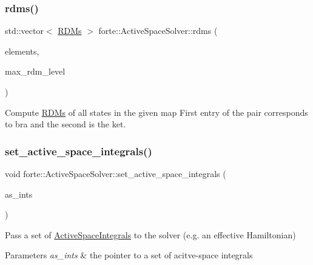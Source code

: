 \subsubsection{\texorpdfstring{rdms()}{rdms()}}
{\footnotesize\ttfamily std\+::vector$<$ \mbox{\hyperlink{classforte_1_1_r_d_ms}{R\+D\+Ms}} $>$ forte\+::\+Active\+Space\+Solver\+::rdms (\begin{DoxyParamCaption}\item[{std\+::map$<$ std\+::pair$<$ \mbox{\hyperlink{classforte_1_1_state_info}{State\+Info}}, \mbox{\hyperlink{classforte_1_1_state_info}{State\+Info}} $>$, std\+::vector$<$ std\+::pair$<$ size\+\_\+t, size\+\_\+t $>$$>$$>$ \&}]{elements,  }\item[{int}]{max\+\_\+rdm\+\_\+level }\end{DoxyParamCaption})}

Compute \mbox{\hyperlink{classforte_1_1_r_d_ms}{R\+D\+Ms}} of all states in the given map First entry of the pair corresponds to bra and the second is the ket. \mbox{\label{classforte_1_1_active_space_solver_aff170a7857b4887368d74e82847188d0}} 
\subsubsection{\texorpdfstring{set\+\_\+active\+\_\+space\+\_\+integrals()}{set\_active\_space\_integrals()}}
{\footnotesize\ttfamily void forte\+::\+Active\+Space\+Solver\+::set\+\_\+active\+\_\+space\+\_\+integrals (\begin{DoxyParamCaption}\item[{std\+::shared\+\_\+ptr$<$ \mbox{\hyperlink{classforte_1_1_active_space_integrals}{Active\+Space\+Integrals}} $>$}]{as\+\_\+ints }\end{DoxyParamCaption})\hspace{0.3cm}{\ttfamily [inline]}}

Pass a set of \mbox{\hyperlink{classforte_1_1_active_space_integrals}{Active\+Space\+Integrals}} to the solver (e.\+g. an effective Hamiltonian) 
\begin{DoxyParams}{Parameters}
{\em as\+\_\+ints} & the pointer to a set of acitve-\/space integrals \\
\hline
\end{DoxyParams}
\mbox{\label{classforte_1_1_active_space_solver_a40e5dded4471f30b5aa7afbe27167031}} 
